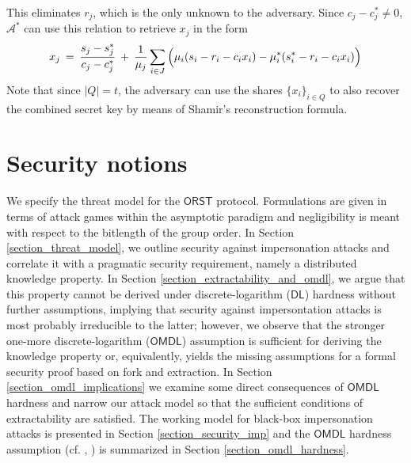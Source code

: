 \documentclass{iacrtrans}
\begin{document}
This eliminates $r_j$,
which is the only unknown to the adversary.
Since $c_j - c_j^* \neq 0$,
$\mathcal{A}^*$ can use this relation to retrieve
$x_j$ in the form
\vspace{5pt}
\begin{equation}\label{orst_key_recovery}
x_j
\hspace{2pt}
=
\hspace{2pt}
\frac{s_j - s_j^*}{c_j - c_j^*}
\hspace{2pt}
+
\hspace{2pt}
\frac{1}{\mu_j} \sum_{i \in J}
\hspace{0pt}
\Big(
	\mu_i (s_i - r_i - c_i x_i) -
	\mu_i^* (s_i^* - r_i - c_i x_i)
\Big)\hspace{1pt}
\vspace{5pt}
\end{equation}
\noindent
Note that since $|Q| = t$, the adversary can use
the shares $\{x_i\}_{i \in Q}$
to also recover the combined secret key
by means of Shamir's reconstruction formula.

\section{Security notions}\label{section_security_notions}

\noindent
We specify the threat model for the
$\mathsf{ORST}$ protocol.
Formulations are given in terms of attack games within the
asymptotic paradigm and negligibility
is meant with respect to the bitlength
of the group order.
In Section \ref{section_threat_model}, we outline
security against impersonation attacks
and correlate it with a pragmatic security requirement,
namely a distributed knowledge property.
In Section \ref{section_extractability_and_omdl},
we argue that this property cannot be derived
under discrete-logarithm ($\mathsf{DL}$) hardness
without further assumptions,
implying that security against impersontation
attacks is most probably irreducible
to the latter;
however, we observe that the stronger
one-more discrete-logarithm ($\mathsf{OMDL}$) assumption
is sufficient for deriving the knowledge property or,
equivalently, yields the missing assumptions
for a formal security proof based on fork and extraction.
In Section \ref{section_omdl_implications}
we examine some direct consequences of $\mathsf{OMDL}$ hardness
and narrow our attack model
so that the sufficient conditions of extractability are satisfied.
The working model for black-box impersonation attacks is presented
in Section \ref{section_security_imp}
and the $\mathsf{OMDL}$ hardness assumption
(cf. \cite{paper_bellare_palacio}, \cite{paper_bellare_omdl})
is summarized in Section
\ref{section_omdl_hardness}.
\end{document}
